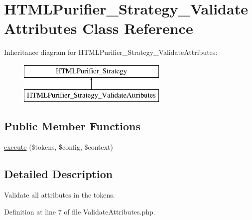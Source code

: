 \hypertarget{classHTMLPurifier__Strategy__ValidateAttributes}{\section{H\+T\+M\+L\+Purifier\+\_\+\+Strategy\+\_\+\+Validate\+Attributes Class Reference}
\label{classHTMLPurifier__Strategy__ValidateAttributes}
}
Inheritance diagram for H\+T\+M\+L\+Purifier\+\_\+\+Strategy\+\_\+\+Validate\+Attributes\+:\begin{figure}[H]
\begin{center}
\leavevmode
\includegraphics[height=2.000000cm]{classHTMLPurifier__Strategy__ValidateAttributes}
\end{center}
\end{figure}
\subsection*{Public Member Functions}
\begin{DoxyCompactItemize}
\item 
\hyperlink{classHTMLPurifier__Strategy__ValidateAttributes_a4a1b5f27e0b867de35418c5c642eaf11}{execute} (\$tokens, \$config, \$context)
\end{DoxyCompactItemize}


\subsection{Detailed Description}
Validate all attributes in the tokens. 

Definition at line 7 of file Validate\+Attributes.\+php.



